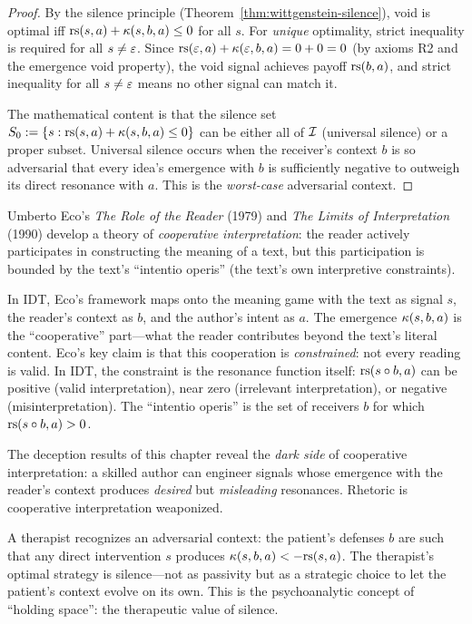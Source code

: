 \begin{proof}
By the silence principle (Theorem~\ref{thm:wittgenstein-silence}), void is
optimal iff $\mathrm{rs}(s, a) + \kappa(s, b, a) \leq 0$ for all $s$. For
\emph{unique} optimality, strict inequality is required for all $s \neq \varepsilon$.
Since $\mathrm{rs}(\varepsilon, a) + \kappa(\varepsilon, b, a) = 0 + 0 = 0$ (by axioms R2 and the
emergence void property), the void signal achieves payoff $\mathrm{rs}(b, a)$, and
strict inequality for all $s \neq \varepsilon$ means no other signal can match it.

The mathematical content is that the silence set
$S_0 := \{s : \mathrm{rs}(s, a) + \kappa(s, b, a) \leq 0\}$ can be either
all of $\mathcal{I}$ (universal silence) or a proper subset. Universal silence
occurs when the receiver's context $b$ is so adversarial that every idea's
emergence with $b$ is sufficiently negative to outweigh its direct resonance
with $a$. This is the \emph{worst-case} adversarial context.
\end{proof}

\begin{interpretation}
Umberto Eco's \emph{The Role of the Reader} (1979) and \emph{The Limits
of Interpretation} (1990) develop a theory of \emph{cooperative
interpretation}: the reader actively participates in constructing the
meaning of a text, but this participation is bounded by the text's
``intentio operis'' (the text's own interpretive constraints).

In IDT, Eco's framework maps onto the meaning game with the text as
signal $s$, the reader's context as $b$, and the author's intent as $a$.
The emergence $\kappa(s, b, a)$ is the ``cooperative'' part---what the
reader contributes beyond the text's literal content. Eco's key claim
is that this cooperation is \emph{constrained}: not every reading is
valid. In IDT, the constraint is the resonance function itself:
$\mathrm{rs}(s \circ b, a)$ can be positive (valid interpretation), near zero
(irrelevant interpretation), or negative (misinterpretation). The
``intentio operis'' is the set of receivers $b$ for which
$\mathrm{rs}(s \circ b, a) > 0$.

The deception results of this chapter reveal the \emph{dark side} of
cooperative interpretation: a skilled author can engineer signals whose
emergence with the reader's context produces \emph{desired} but
\emph{misleading} resonances. Rhetoric is cooperative interpretation
weaponized.
\end{interpretation}

\begin{example}
A therapist recognizes an adversarial context: the patient's defenses $b$ are
such that any direct intervention $s$ produces $\kappa(s, b, a) < -\mathrm{rs}(s, a)$.
The therapist's optimal strategy is silence---not as passivity but as a
strategic choice to let the patient's context evolve on its own. This is the
psychoanalytic concept of ``holding space'': the therapeutic value of silence.
\end{example}

